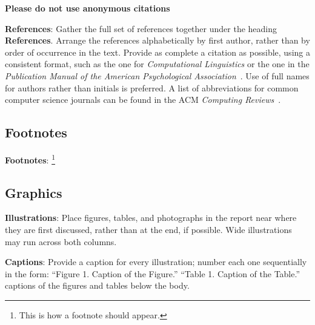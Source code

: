 \documentclass[11pt]{article}
\begin{document}
	\textbf{Please do not use anonymous citations}
	
	\textbf{References}: Gather the full set of references together under
	the heading {\bf References}. Arrange the references alphabetically
	by first author, rather than by order of occurrence in the text.
	Provide as complete a citation as possible, using a consistent format,
	such as the one for {\em Computational Linguistics\/} or the one in the
	{\em Publication Manual of the American
		Psychological Association\/}~\cite{APA:83}. Use of full names for
	authors rather than initials is preferred.  A list of abbreviations
	for common computer science journals can be found in the ACM
	{\em Computing Reviews\/}~\cite{ACM:83}.
	
	\subsection{Footnotes}
	
	{\bf Footnotes}: \footnote{This is how a footnote should appear.}
	
	\subsection{Graphics}
	
	{\bf Illustrations}: Place figures, tables, and photographs in the
	report near where they are first discussed, rather than at the end, if
	possible.  Wide illustrations may run across both columns.
	
	{\bf Captions}: Provide a caption for every illustration; number each one
	sequentially in the form:  ``Figure 1. Caption of the Figure.'' ``Table 1.
	Caption of the Table.''  captions of the figures and
	tables below the body.
	
\end{document}
